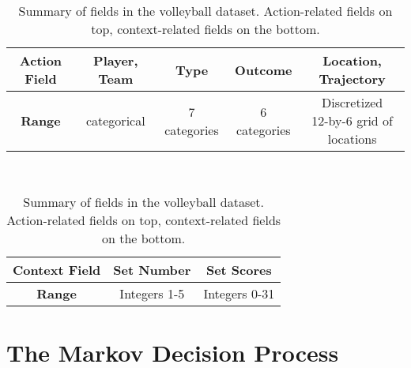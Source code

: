 \documentclass{sfuthesis}
\begin{document}
	\begin{table}[ht]
		\centering
		\begin{tabular}{c|c|c|c|c}
			\textbf{Action Field} & \textbf{Player, Team} & \textbf{Type} & \textbf{Outcome} & \textbf{Location, Trajectory}         \\ \hline
			\textbf{Range} & categorical           & 7 categories  & 6 categories     & \makecell[c]{Discretized\\ 12-by-6 grid of locations}
		\end{tabular}
		\\ \vspace{0.75cm}
		\begin{tabular}{c|c|c}
			\textbf{Context Field} & \textbf{Set Number} & \textbf{Set Scores}    \\ \hline
			\textbf{Range} & Integers 1-5        & Integers 0-31
		\end{tabular}
		\caption{Summary of fields in the volleyball dataset. Action-related fields on top, context-related fields on the bottom.}
		\label{tab:data-fields}
	\end{table}
	
	\section{The Markov Decision Process}
	\label{section-mdp}
	
\end{document}
